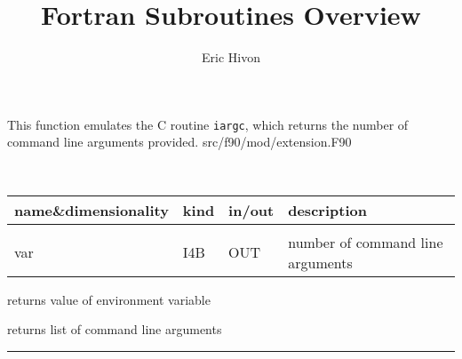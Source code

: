\sloppy

\title{\healpix Fortran Subroutines Overview}
 \section[nArguments]{ }
\label{sub:narguments}
\author{Eric Hivon}

\begin{facility}
{This function emulates the C routine {\tt iargc}, which returns the number of
command line arguments provided.}
{src/f90/mod/extension.F90}
\end{facility}

\begin{f90function}
{\ }
\end{f90function}

\begin{arguments}
{
\begin{tabular}{p{0.3\hsize} p{0.05\hsize} p{0.1\hsize} p{0.45\hsize}} \hline  
\textbf{name\&dimensionality} & \textbf{kind} & \textbf{in/out} & \textbf{description} \\ \hline
                   &   &   &                           \\ %
var & I4B & OUT & number of command line arguments

\end{tabular}}
\end{arguments}


\begin{related}
  \begin{sulist}{} %
  \item[\htmlref{getEnvironment}{sub:getenvironment}] returns value of
  environment variable
  \item[\htmlref{getArgument}{sub:getargument}] returns list of command line arguments
  \end{sulist}
\end{related}

\rule{\hsize}{2mm}

\newpage
